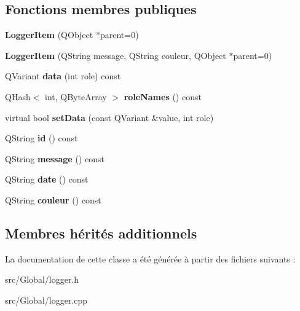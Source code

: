 \subsection*{Fonctions membres publiques}
\begin{DoxyCompactItemize}
\item 
{\bfseries Logger\+Item} (Q\+Object $\ast$parent=0)\hypertarget{class_logger_item_ada622893bd2c38aa2b2944ed2d141b00}{}\label{class_logger_item_ada622893bd2c38aa2b2944ed2d141b00}

\item 
{\bfseries Logger\+Item} (Q\+String message, Q\+String couleur, Q\+Object $\ast$parent=0)\hypertarget{class_logger_item_ab309a32922f728dcf2bd4ec732389e75}{}\label{class_logger_item_ab309a32922f728dcf2bd4ec732389e75}

\item 
Q\+Variant {\bfseries data} (int role) const \hypertarget{class_logger_item_a767a5c9088ad19094fefdba8610ded21}{}\label{class_logger_item_a767a5c9088ad19094fefdba8610ded21}

\item 
Q\+Hash$<$ int, Q\+Byte\+Array $>$ {\bfseries role\+Names} () const \hypertarget{class_logger_item_a6f4ef07c47dc7eef231cae42b6c3769b}{}\label{class_logger_item_a6f4ef07c47dc7eef231cae42b6c3769b}

\item 
virtual bool {\bfseries set\+Data} (const Q\+Variant \&value, int role)\hypertarget{class_logger_item_a8cd7bab29e0a08cbb076c4f963d3ed47}{}\label{class_logger_item_a8cd7bab29e0a08cbb076c4f963d3ed47}

\item 
Q\+String {\bfseries id} () const \hypertarget{class_logger_item_ac468e59817754ab6809fa555317ad3d6}{}\label{class_logger_item_ac468e59817754ab6809fa555317ad3d6}

\item 
Q\+String {\bfseries message} () const \hypertarget{class_logger_item_acfc80bd56ae12b8792e529c175aa4072}{}\label{class_logger_item_acfc80bd56ae12b8792e529c175aa4072}

\item 
Q\+String {\bfseries date} () const \hypertarget{class_logger_item_a9421782b0d913cd2b5d7f0b467b670df}{}\label{class_logger_item_a9421782b0d913cd2b5d7f0b467b670df}

\item 
Q\+String {\bfseries couleur} () const \hypertarget{class_logger_item_aebb12082d712174abce71ae97015884b}{}\label{class_logger_item_aebb12082d712174abce71ae97015884b}

\end{DoxyCompactItemize}
\subsection*{Membres hérités additionnels}


La documentation de cette classe a été générée à partir des fichiers suivants \+:\begin{DoxyCompactItemize}
\item 
src/\+Global/logger.\+h\item 
src/\+Global/logger.\+cpp\end{DoxyCompactItemize}
